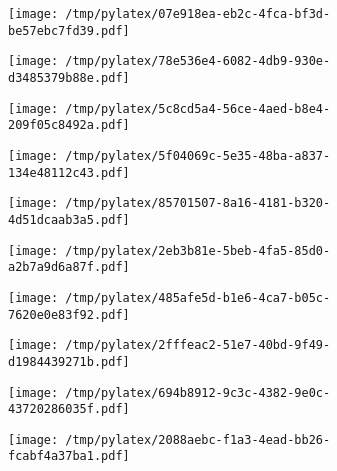 \documentclass{article}
\begin{document}
\begin{figure}[htbp]
\begin{subfigure}[b]{.3\linewidth}
\texttt{[image: /tmp/pylatex/07e918ea-eb2c-4fca-bf3d-be57ebc7fd39.pdf]}
\end{subfigure}
\begin{subfigure}[b]{.3\linewidth}
\texttt{[image: /tmp/pylatex/78e536e4-6082-4db9-930e-d3485379b88e.pdf]}
\end{subfigure}
\begin{subfigure}[b]{.3\linewidth}
\texttt{[image: /tmp/pylatex/5c8cd5a4-56ce-4aed-b8e4-209f05c8492a.pdf]}
\end{subfigure}
\begin{subfigure}[b]{.3\linewidth}
\texttt{[image: /tmp/pylatex/5f04069c-5e35-48ba-a837-134e48112c43.pdf]}
\end{subfigure}
\begin{subfigure}[b]{.3\linewidth}
\texttt{[image: /tmp/pylatex/85701507-8a16-4181-b320-4d51dcaab3a5.pdf]}
\end{subfigure}
\begin{subfigure}[b]{.3\linewidth}
\texttt{[image: /tmp/pylatex/2eb3b81e-5beb-4fa5-85d0-a2b7a9d6a87f.pdf]}
\end{subfigure}
\begin{subfigure}[b]{.3\linewidth}
\texttt{[image: /tmp/pylatex/485afe5d-b1e6-4ca7-b05c-7620e0e83f92.pdf]}
\end{subfigure}
\begin{subfigure}[b]{.3\linewidth}
\texttt{[image: /tmp/pylatex/2fffeac2-51e7-40bd-9f49-d1984439271b.pdf]}
\end{subfigure}
\begin{subfigure}[b]{.3\linewidth}
\texttt{[image: /tmp/pylatex/694b8912-9c3c-4382-9e0c-43720286035f.pdf]}
\end{subfigure}
\begin{subfigure}[b]{.3\linewidth}
\texttt{[image: /tmp/pylatex/2088aebc-f1a3-4ead-bb26-fcabf4a37ba1.pdf]}
\end{subfigure}
\end{figure}
\end{document}
